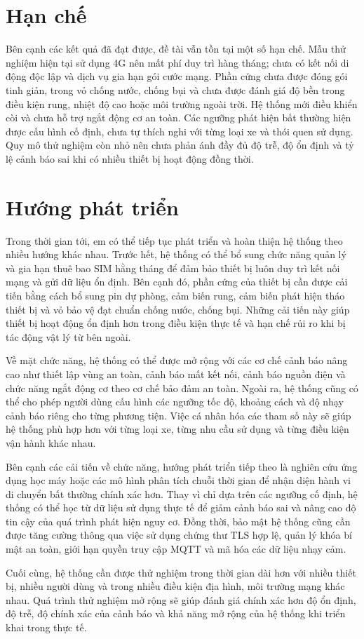 \documentclass[../DoAn.tex]{subfiles}
\begin{document}
\section{Hạn chế}

Bên cạnh các kết quả đã đạt được, đề tài vẫn tồn tại một số hạn chế. Mẫu thử
nghiệm hiện tại sử dụng 4G nên mất phí duy trì hàng tháng; chưa có kết nối di động độc lập và dịch vụ gia hạn gói cước mạng. Phần cứng chưa được đóng gói tinh giản, trong vỏ chống nước, chống bụi và chưa
được đánh giá độ bền trong điều kiện rung, nhiệt độ cao hoặc môi trường ngoài
trời. Hệ thống mới điều khiển còi và chưa hỗ trợ ngắt động cơ an toàn. Các
ngưỡng phát hiện bất thường hiện được cấu hình cố định, chưa tự thích nghi với
từng loại xe và thói quen sử dụng. Quy mô thử nghiệm còn nhỏ nên chưa phản ánh
đầy đủ độ trễ, độ ổn định và tỷ lệ cảnh báo sai khi có nhiều thiết bị hoạt
động đồng thời.

\section{Hướng phát triển}

Trong thời gian tới, em có thể tiếp tục phát triển và hoàn thiện hệ thống theo nhiều hướng khác nhau. Trước hết, hệ thống có thể bổ sung chức năng quản lý và gia hạn thuê bao SIM hằng tháng để đảm bảo thiết bị luôn duy trì kết nối mạng và gửi dữ liệu ổn định. Bên cạnh đó, phần cứng của thiết bị cần được cải tiến bằng cách bổ sung pin dự phòng, cảm biến rung, cảm biến phát hiện tháo thiết bị và vỏ bảo vệ đạt chuẩn chống nước, chống bụi. Những cải tiến này giúp thiết bị hoạt động ổn định hơn trong điều kiện thực tế và hạn chế rủi ro khi bị tác động vật lý từ bên ngoài.

Về mặt chức năng, hệ thống có thể được mở rộng với các cơ chế cảnh báo nâng cao như thiết lập vùng an toàn, cảnh báo mất kết nối, cảnh báo nguồn điện và chức năng ngắt động cơ theo cơ chế bảo đảm an toàn. Ngoài ra, hệ thống cũng có thể cho phép người dùng cấu hình các ngưỡng tốc độ, khoảng cách và độ nhạy cảnh báo riêng cho từng phương tiện. Việc cá nhân hóa các tham số này sẽ giúp hệ thống phù hợp hơn với từng loại xe, từng nhu cầu sử dụng và từng điều kiện vận hành khác nhau.

Bên cạnh các cải tiến về chức năng, hướng phát triển tiếp theo là nghiên cứu ứng dụng học máy hoặc các mô hình phân tích chuỗi thời gian để nhận diện hành vi di chuyển bất thường chính xác hơn. Thay vì chỉ dựa trên các ngưỡng cố định, hệ thống có thể học từ dữ liệu sử dụng thực tế để giảm cảnh báo sai và nâng cao độ tin cậy của quá trình phát hiện nguy cơ. Đồng thời, bảo mật hệ thống cũng cần được tăng cường thông qua việc sử dụng chứng thư TLS hợp lệ, quản lý khóa bí mật an toàn, giới hạn quyền truy cập MQTT và mã hóa các dữ liệu nhạy cảm.

Cuối cùng, hệ thống cần được thử nghiệm trong thời gian dài hơn với nhiều thiết bị, nhiều người dùng và trong nhiều điều kiện địa hình, môi trường mạng khác nhau. Quá trình thử nghiệm mở rộng sẽ giúp đánh giá chính xác hơn độ ổn định, độ trễ, độ chính xác của cảnh báo và khả năng mở rộng của hệ thống khi triển khai trong thực tế.
\end{document}

